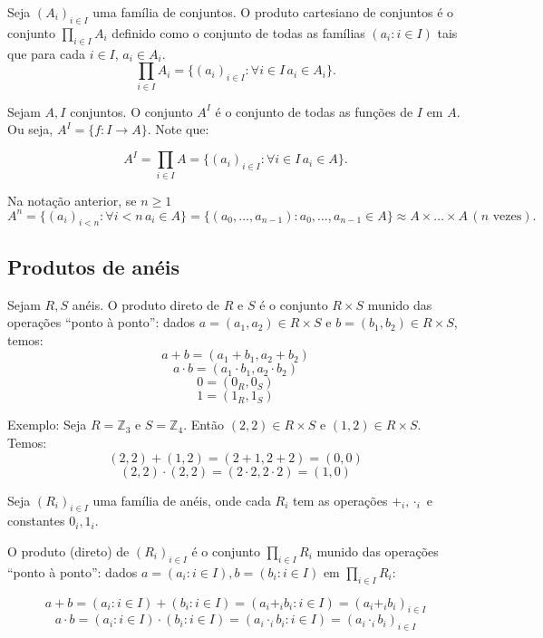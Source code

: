 \begin{definition}
Seja $(A_i)_{i \in I}$ uma família de conjuntos. O produto cartesiano de conjuntos é o conjunto $\prod_{i \in I} A_i$ definido como o conjunto de todas as famílias $(a_i: i \in I)$ tais que para cada $i \in I$, $a_i \in A_i$.
$$\prod_{i \in I} A_i=\{(a_i)_{i \in I}: \forall i \in I\, a_i \in A_i\}.$$
\end{definition}


\begin{definition}
    Sejam $A, I$ conjuntos. O conjunto $A^I$ é o conjunto de todas as funções de $I$ em $A$. Ou seja, $A^I=\{f:I\rightarrow A\}$. Note que:

    $$A^I=\prod_{i \in I}A=\{(a_i)_{i \in I}: \forall i \in I\,  a_i\in A\}.$$
    \end{definition}

    Na notação anterior, se $n\geq 1$ $$A^n=\{(a_i)_{i<n}:\forall i<n\, a_i \in A\}=\{(a_0, \dots, a_{n-1}):a_0, \dots, a_{n-1}\in A\}\approx A\times \dots \times A \,(n \text{ vezes}).$$
    \subsection{Produtos de anéis}

    \begin{definition}
        Sejam $R, S$ anéis. O produto direto de $R$ e $S$ é o conjunto $R\times S$ munido das operações ``ponto à ponto'': dados $a=(a_1, a_2)\in R\times S$ e $b=(b_1, b_2)\in R\times S$, temos:
        $$a+b=(a_1+b_1, a_2+b_2)$$
        $$a\cdot b=(a_1\cdot b_1, a_2\cdot b_2)$$
        $$0=(0_R, 0_S)$$
        $$1=(1_R, 1_S)$$
    \end{definition}
    
    Exemplo: Seja $R=\mathbb Z_3$ e $S=\mathbb Z_4$. Então $(2, 2)\in R\times S$ e $(1, 2)\in R\times S$. Temos:
    $$(2, 2)+(1, 2)=(2+ 1, 2+ 2)=(0, 0)$$
    $$(2, 2)\cdot (2, 2)=(2\cdot 2, 2\cdot 2)=(1, 0)$$

\begin{definition}
    Seja $(R_i)_{i \in I}$ uma família de anéis, onde cada $R_i$ tem as operações $+_i, \cdot_i$ e constantes $0_i, 1_i$.
    
    O produto (direto) de $(R_i)_{i \in I}$ é o conjunto $\prod_{i \in I} R_i$ munido das operações ``ponto à ponto'': dados $a=(a_i: i \in I), b=(b_i: i \in I)$ em $\prod_{i \in I}R_i$:

    $$a+b=(a_i: i \in I)+(b_i: i \in I)=(a_i+_i b_i: i \in I)=(a_i+_ib_i)_{i \in I}$$
    $$a\cdot b=(a_i: i \in I)\cdot (b_i: i \in I)=(a_i\cdot _i b_i: i \in I)=(a_i\cdot _ib_i)_{i \in I}$$

\end{definition}

